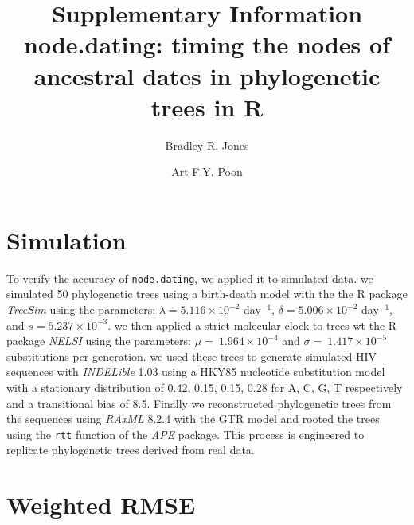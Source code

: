 \documentclass[12pt]{article}
\newcommand{\code}[1]{{\tt #1}}
\begin{document}
\title{Supplementary Information \\ node.dating: timing the nodes of ancestral dates in phylogenetic trees in R}

\author[1,2,*]{Bradley R. Jones}
\author[2,3]{Art F.Y. Poon}

\date{}

\maketitle

\section{Simulation} \label{sec:sim}
To verify the accuracy of \code{node.dating}, we applied it to simulated data.
we simulated 50 phylogenetic trees using a birth-death model with the the R package \emph{TreeSim} \citep{TreeSim} using the parameters: $\lambda = 5.116 \times 10^{-2}$ day$^{-1}$, $\delta = 5.006 \times 10^{-2}$ day$^{-1}$, and $s = 5.237 \times 10^{-3}$.
we then applied a strict molecular clock to trees wt the R package \emph{NELSI} \citep{NELSI} using the parameters: $\mu = \ 1.964\times 10^{-4}$ and $\sigma = \ 1.417\times 10^{-5}$ substitutions per generation.
we used these trees to generate simulated HIV sequences with \emph{INDELible} 1.03 \citep{Indelible09} using a HKY85 nucleotide substitution model \citep{HKY85} with a stationary distribution of 0.42, 0.15, 0.15, 0.28 for A, C, G, T respectively and a transitional bias of 8.5.
Finally we reconstructed phylogenetic trees from the sequences using \emph{RAxML} 8.2.4 \citep{Raxml14} with the GTR model and rooted the trees using the \code{rtt} function of the \emph{APE} package.
This process is engineered to replicate phylogenetic trees derived from real data.

\section{Weighted RMSE} \label{sec:rmse}
\end{document}
